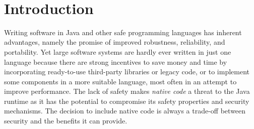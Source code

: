 \documentclass[a4paper,12pt,twoside,openright]{report}
\begin{document}

\pagestyle{empty}
\singlespacing

\onehalfspacing

\singlespacing


\setcounter{page}{0}
\pagestyle{plain}
\tableofcontents

\onehalfspacing
\newpage ~ \cleardoublepage %

\setcounter{page}{1} 

\chapter{Introduction}

Writing software in Java and other safe programming languages has inherent advantages, namely the promise of improved robustness, reliability, and portability. Yet large software systems are hardly ever written in just one language because there are strong incentives to save money and time by incorporating ready-to-use third-party libraries or legacy code, or to implement some components in a more suitable language, most often in an attempt to improve performance. The lack of safety makes \emph{native code} a threat to the Java runtime as it has the potential to compromise its safety properties and security mechanisms. The decision to include native code is always a trade-off between security and the benefits it can provide.
 
\end{document}
